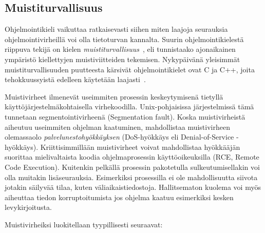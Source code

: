 \subsection{Muistiturvallisuus}
\label{Muistivirheet}

Ohjelmointikieli vaikuttaa ratkaisevasti siihen miten laajoja seurauksia ohjelmointivirheillä voi olla tietoturvan kannalta.
Suurin ohjelmointikielestä riippuva tekijä on kielen \emph{muistiturvallisuus}~\cite{SoftBound},
eli tunnistaako ajonaikainen ympäristö kiellettyjen muistiviitteiden tekemisen.
Nykypäivänä yleisimmät muistiturvallisuuden puutteesta kärsivät ohjelmointikielet ovat C ja C++,
joita tehokkuussyistä edelleen käytetään laajasti~\cite{StaticallyDetecting,SoftBound}.

Muistivirheet ilmenevät useimmiten prosessin keskeytymisenä tietyllä
käyt\-tö\-jär\-jes\-tel\-mä\-koh\-tai\-sel\-la virhekoodilla.
Unix-pohjaisissa järjestelmissä tämä tunnetaan segmentointivirheenä (Segmentation fault).
Koska muistivirheistä aiheutuu useimmiten ohjelman kaatuminen,
mahdollistaa muistivirheen olemassaolo \emph{palvelunestohyökkäyksen} (DoS-hyökkäys eli Denial-of-Service -hyökkäys).
Kriittisimmillään muistivirheet voivat mahdollistaa hyökkääjän suorittaa mielivaltaista koodia
ohjelmaprosessin käyttöoikeuksilla (RCE, Remote Code Execution).
Kuitenkin pelkällä prosessin pakotetulla sulkeutumisellakin voi olla muitakin lisäseurauksia.
Esimerkiksi prosessilla ei ole mahdollisuutta siivota jotakin säilyvää tilaa,
kuten väliaikaistiedostoja.
Hallitsematon kuolema voi myös aiheuttaa tiedon korruptoitumista jos ohjelma kaatuu esimerkiksi kesken levykirjoitusta.

Muistivirheiksi luokitellaan tyypillisesti seuraavat:

